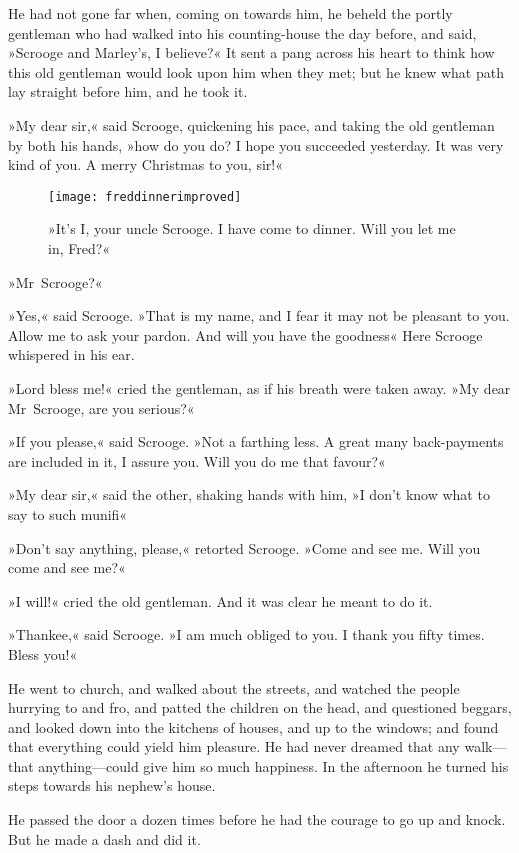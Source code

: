 He had not gone far when, coming on towards him, he beheld the portly gentleman who had walked into his counting-house the day before, and said, »Scrooge and Marley's, I believe?« It sent a pang across his heart to think how this old gentleman would look upon him when they met; but he knew what path lay straight before him, and he took it.

»My dear sir,« said Scrooge, quickening his pace, and taking the old gentleman by both his hands, »how do you do? I hope you succeeded yesterday. It was very kind of you. A merry Christmas to you, sir!«

\begin{figure}[p]
\centering
\texttt{[image: freddinnerimproved]}
\caption[\textbf{»Will you let me in, Fred?«}]{»It's I, your uncle Scrooge. I have come to dinner. Will you let me in, Fred?«}
\end{figure}

»Mr~Scrooge?«

»Yes,« said Scrooge. »That is my name, and I fear it may not be pleasant to you. Allow me to ask your pardon. And will you have the goodness\longdash« Here Scrooge whispered in his ear.

»Lord bless me!« cried the gentleman, as if his breath were taken away. »My dear Mr~Scrooge, are you serious?«

»If you please,« said Scrooge. »Not a farthing less. A great many back-payments are included in it, I assure you. Will you do me that favour?«

»My dear sir,« said the other, shaking hands with him, »I don't know what to say to such munifi\longdash«

»Don't say anything, please,« retorted Scrooge. »Come and see me. Will you come and see me?«

»I will!« cried the old gentleman. And it was clear he meant to do it.

»Thankee,« said Scrooge. »I am much obliged to you. I thank you fifty times. Bless you!«

He went to church, and walked about the streets, and watched the people hurrying to and fro, and patted the children on the head, and questioned beggars, and looked down into the kitchens of houses, and up to the windows; and found that everything could yield him pleasure. He had never dreamed that any walk---that anything---could give him so much happiness. In the afternoon he turned his steps towards his nephew's house.

He passed the door a dozen times before he had the courage to go up and knock. But he made a dash and did it.

